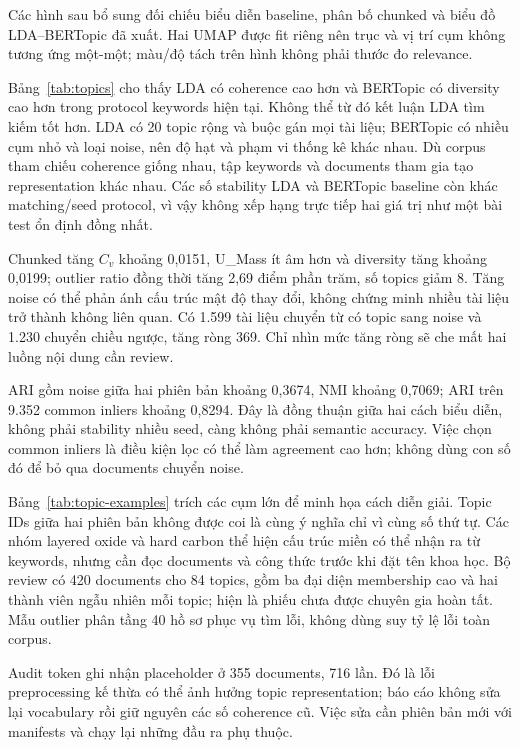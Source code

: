 
Các hình sau bổ sung đối chiếu biểu diễn baseline, phân bố chunked và biểu đồ LDA--BERTopic đã xuất. Hai UMAP được fit riêng nên trục và vị trí cụm không tương ứng một-một; màu/độ tách trên hình không phải thước đo relevance.

Bảng~\ref{tab:topics} cho thấy LDA có coherence cao hơn và BERTopic có diversity cao hơn trong protocol keywords hiện tại. Không thể từ đó kết luận LDA tìm kiếm tốt hơn. LDA có 20 topic rộng và buộc gán mọi tài liệu; BERTopic có nhiều cụm nhỏ và loại noise, nên độ hạt và phạm vi thống kê khác nhau. Dù corpus tham chiếu coherence giống nhau, tập keywords và documents tham gia tạo representation khác nhau. Các số stability LDA và BERTopic baseline còn khác matching/seed protocol, vì vậy không xếp hạng trực tiếp hai giá trị như một bài test ổn định đồng nhất.

Chunked tăng $C_v$ khoảng 0,0151, U\_Mass ít âm hơn và diversity tăng khoảng 0,0199; outlier ratio đồng thời tăng 2,69 điểm phần trăm, số topics giảm 8. Tăng noise có thể phản ánh cấu trúc mật độ thay đổi, không chứng minh nhiều tài liệu trở thành không liên quan. Có 1.599 tài liệu chuyển từ có topic sang noise và 1.230 chuyển chiều ngược, tăng ròng 369. Chỉ nhìn mức tăng ròng sẽ che mất hai luồng nội dung cần review.

ARI gồm noise giữa hai phiên bản khoảng 0,3674, NMI khoảng 0,7069; ARI trên 9.352 common inliers khoảng 0,8294. Đây là đồng thuận giữa hai cách biểu diễn, không phải stability nhiều seed, càng không phải semantic accuracy. Việc chọn common inliers là điều kiện lọc có thể làm agreement cao hơn; không dùng con số đó để bỏ qua documents chuyển noise.


Bảng~\ref{tab:topic-examples} trích các cụm lớn để minh họa cách diễn giải. Topic IDs giữa hai phiên bản không được coi là cùng ý nghĩa chỉ vì cùng số thứ tự. Các nhóm layered oxide và hard carbon thể hiện cấu trúc miền có thể nhận ra từ keywords, nhưng cần đọc documents và công thức trước khi đặt tên khoa học. Bộ review có 420 documents cho 84 topics, gồm ba đại diện membership cao và hai thành viên ngẫu nhiên mỗi topic; hiện là phiếu chưa được chuyên gia hoàn tất. Mẫu outlier phân tầng 40 hồ sơ phục vụ tìm lỗi, không dùng suy tỷ lệ lỗi toàn corpus.

Audit token ghi nhận placeholder ở 355 documents, 716 lần. Đó là lỗi preprocessing kế thừa có thể ảnh hưởng topic representation; báo cáo không sửa lại vocabulary rồi giữ nguyên các số coherence cũ. Việc sửa cần phiên bản mới với manifests và chạy lại những đầu ra phụ thuộc.

